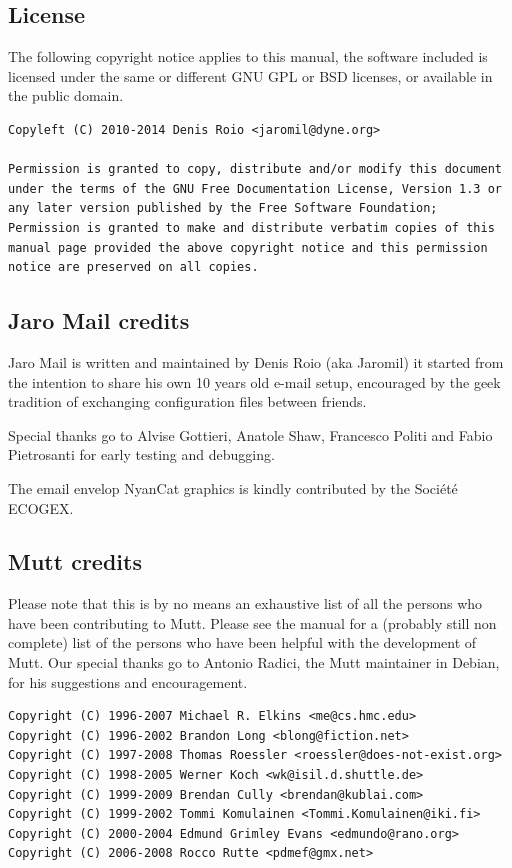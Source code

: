\documentclass[a4,onecolumn,portrait]{article}
\begin{document}
\subsection{License}
\label{sec-11-1}

The following copyright notice applies to this manual, the software
included is licensed under the same or different GNU GPL or BSD
licenses, or available in the public domain.

\begin{verbatim}
Copyleft (C) 2010-2014 Denis Roio <jaromil@dyne.org>

Permission is granted to copy, distribute and/or modify this document
under the terms of the GNU Free Documentation License, Version 1.3 or
any later version published by the Free Software Foundation;
Permission is granted to make and distribute verbatim copies of this
manual page provided the above copyright notice and this permission
notice are preserved on all copies.
\end{verbatim}

\subsection{Jaro Mail credits}
\label{sec-11-2}

Jaro Mail is written and maintained by Denis Roio (aka Jaromil) it
started from the intention to share his own 10 years old e-mail setup,
encouraged by the geek tradition of exchanging configuration files
between friends.

Special thanks go to Alvise Gottieri, Anatole Shaw, Francesco Politi
and Fabio Pietrosanti for early testing and debugging.

The email envelop NyanCat graphics is kindly contributed by the
Société ECOGEX.
\subsection{Mutt credits}
\label{sec-11-3}

Please note that this is by no means an exhaustive list of all the
persons who have been contributing to Mutt.  Please see the
manual for a (probably still non complete) list of the persons who
have been helpful with the development of Mutt. Our special thanks go to
Antonio Radici, the Mutt maintainer in Debian, for his suggestions and
encouragement.

\begin{verbatim}
Copyright (C) 1996-2007 Michael R. Elkins <me@cs.hmc.edu>
Copyright (C) 1996-2002 Brandon Long <blong@fiction.net>
Copyright (C) 1997-2008 Thomas Roessler <roessler@does-not-exist.org>
Copyright (C) 1998-2005 Werner Koch <wk@isil.d.shuttle.de>
Copyright (C) 1999-2009 Brendan Cully <brendan@kublai.com>
Copyright (C) 1999-2002 Tommi Komulainen <Tommi.Komulainen@iki.fi>
Copyright (C) 2000-2004 Edmund Grimley Evans <edmundo@rano.org>
Copyright (C) 2006-2008 Rocco Rutte <pdmef@gmx.net>
\end{verbatim}
\end{document}

